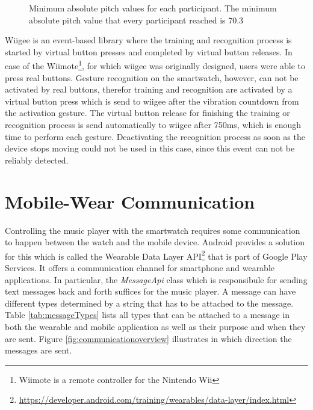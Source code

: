 \begin{figure}
	\myfloatalign
	\caption{Minimum absolute pitch values for each participant. The minimum absolute pitch value that every participant reached is 70.3}
	\label{fig:pitchPlot}
\end{figure}

Wiigee is an event-based library where the training and recognition process is started by virtual button presses and completed by virtual button releases. In case of the Wiimote\footnote{Wiimote is a remote controller for the Nintendo Wii}, for which wiigee was originally designed, users were able to press real buttons. Gesture recognition on the smartwatch, however, can not be activated by real buttons, therefor training and recognition are activated by a virtual button press which is send to wiigee after the vibration countdown from the activation gesture. The virtual button release for finishing the training or recognition process is send automatically to wiigee after 750ms, which is enough time to perform each gesture. Deactivating the recognition process as soon as the device stops moving could not be used in this case, since this event can not be reliably detected.\\

\section{Mobile-Wear Communication}\label{sec:Communication}
Controlling the music player with the smartwatch requires some communication to happen between the watch and the mobile device. Android provides a solution for this which is called the Wearable Data Layer \ac{API}\footnote{\url{https://developer.android.com/training/wearables/data-layer/index.html}} that is part of Google Play Services. It offers a communication channel for smartphone and wearable applications. In particular, the \textit{MessageApi} class which is responsibule for sending text messages back and forth suffices for the music player. A message can have different types determined by a string that has to be attached to the message. Table \ref{tab:messageTypes} lists all types that can be attached to a message in both the wearable and mobile application as well as their purpose and when they are sent. Figure \ref{fig:communicationoverview} illustrates in which direction the messages are sent.

